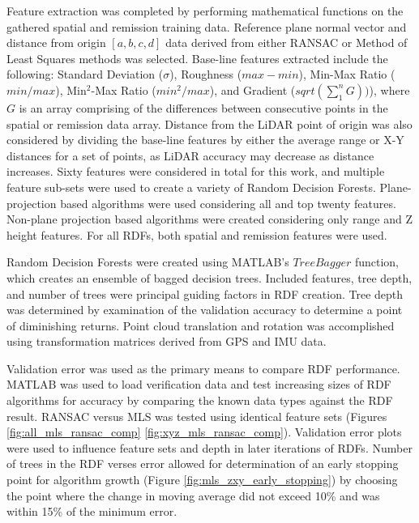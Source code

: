 \documentclass[journal,onecolumn]{IEEEtran}
\begin{document}
	{Feature extraction was completed by performing mathematical functions on the gathered spatial and remission training data. Reference plane normal vector and distance from origin $[a,b,c,d]$ data derived from either RANSAC or Method of Least Squares methods was selected. Base-line features extracted include the following: Standard Deviation ($\sigma$), Roughness ($max - min$), Min-Max Ratio ($min / max$), Min$^{2}$-Max Ratio ($min^2 / max$), and Gradient ($sqrt(\sum_{1}^{n} G))$), where $G$ is an array comprising of the differences between consecutive points in the spatial or remission data array. Distance from the LiDAR point of origin was also considered by dividing the base-line features by either the average range or X-Y distances for a set of points, as LiDAR accuracy may decrease as distance increases. Sixty features were considered in total for this work, and multiple feature sub-sets were used to create a variety of Random Decision Forests. Plane-projection based algorithms were used considering all and top twenty features. Non-plane projection based algorithms were created considering only range and Z height features. For all RDFs, both spatial and remission features were used.} 
	
	{Random Decision Forests were created using MATLAB's $TreeBagger$ function, which creates an ensemble of bagged decision trees. Included features, tree depth, and number of trees were principal guiding factors in RDF creation. Tree depth was determined by examination of the validation accuracy to determine a point of diminishing returns. Point cloud translation and rotation was accomplished using transformation matrices derived from GPS and IMU data.}
		
	
	{Validation error was used as the primary means to compare RDF performance. MATLAB was used to load verification data and test increasing sizes of RDF algorithms for accuracy by comparing the known data types against the RDF result. RANSAC versus MLS was tested using identical feature sets (Figures \ref{fig:all_mls_ransac_comp} \ref{fig:xyz_mls_ransac_comp}). Validation error plots were used to influence feature sets and depth in later iterations of RDFs. Number of trees in the RDF verses error allowed for determination of an early stopping point for algorithm growth (Figure \ref{fig:mls_zxy_early_stopping}) by choosing the point where the change in moving average did not exceed 10\% and was within 15\% of the minimum error.}
	
\end{document}

